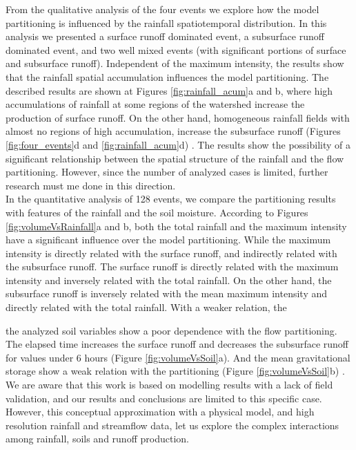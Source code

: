 \documentclass[preprint,12pt]{elsarticle}
\begin{document}
From the qualitative analysis of the four events we explore how the model partitioning is influenced by the rainfall spatiotemporal distribution.  In this analysis we presented a surface runoff dominated event, a subsurface runoff dominated event, and two well mixed events (with significant portions of surface and subsurface runoff).   Independent of the maximum intensity, the results show that the rainfall spatial accumulation  influences the model partitioning. The described results are shown at Figures \ref{fig:rainfall_acum}a and b, where high accumulations of rainfall at some regions of the watershed increase the production of surface runoff.  On the other hand, homogeneous rainfall fields with almost no regions of high accumulation, increase the subsurface runoff (Figures \ref{fig:four_events}d and \ref{fig:rainfall_acum}d) .  The results show the possibility of a significant relationship between the spatial structure of the rainfall and the flow partitioning. However, since the number of analyzed cases is limited, further research must me done in this direction.\\

In the quantitative analysis of 128 events, we compare the partitioning results with features of the rainfall and the soil moisture.  According to Figures \ref{fig:volumeVsRainfall}a and b, both the total rainfall and the maximum intensity have a significant influence over the model partitioning.  While the maximum intensity is directly related with the surface runoff, and indirectly related with the subsurface runoff.  The surface runoff is directly related with the maximum intensity and inversely related with the total rainfall. On the other hand, the subsurface runoff is inversely related with the mean maximum intensity and directly related with the total rainfall.  With a weaker relation, the   

the analyzed soil variables show a poor dependence with the flow partitioning. The elapsed time increases the surface runoff and decreases the subsurface runoff for values under 6 hours (Figure \ref{fig:volumeVsSoil}a). And the mean gravitational storage show a weak relation with the partitioning (Figure \ref{fig:volumeVsSoil}b) .   \\

We are aware that this work is based on modelling results with a lack of field validation, and our results and conclusions are limited to this specific case. However, this conceptual approximation with a physical model, and high resolution rainfall and streamflow data, let us explore the complex interactions among rainfall, soils and runoff production.\\ 
\end{document}
